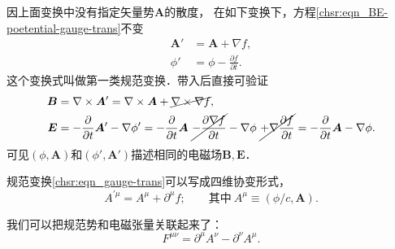 因上面变换中没有指定矢量势$\boldsymbol{A}$的散度，
在如下变换下，方程\eqref{chsr:eqn_BE-poetential-gauge-trans}不变
\begin{subequations}\label{chsr:eqn_gauge-trans}
	\begin{align}
		\boldsymbol{A}' &= \boldsymbol{A} + \nabla f, \label{chsr:eqn_A-gauge-trans} \\
		\phi' &= \phi -\frac{\partial f}{\partial t} . \label{chsr:eqn_phi-gauge-trans}
	\end{align}
\end{subequations}
这个变换式叫做第一类{\heiti 规范变换}．带入后直接可验证
\begin{align*}
	\boldsymbol{B} &= \nabla\times \boldsymbol{A}' = \nabla\times \boldsymbol{A} + \cancel{\nabla \times\nabla f} , \\
	\boldsymbol{E} &= -\frac{\partial}{\partial t} \boldsymbol{A}'  - \nabla \phi' =
	-\frac{\partial}{\partial t} \boldsymbol{A}  \
	\cancel{- \frac{\partial \nabla f}{\partial t} }
	- \nabla \phi \
	\cancel{+ \nabla \frac{\partial f}{\partial t}}
	=-\frac{\partial}{\partial t} \boldsymbol{A}  - \nabla \phi .
\end{align*}
可见$(\phi,\boldsymbol{A})$和$(\phi',\boldsymbol{A}')$描述相同的电磁场$\boldsymbol{B},\boldsymbol{E}$．

规范变换\eqref{chsr:eqn_gauge-trans}可以写成四维协变形式，
\begin{equation}\label{chsr:eqn_gauge-trans-covariant}
	A^{\prime\mu} = A^\mu + \partial^\mu f; \qquad
	\text{其中} \  A^\mu \equiv (\phi/c,\boldsymbol{A}).
\end{equation}

我们可以把规范势和电磁张量关联起来了：
\begin{equation}\label{chsr:eqn_Fab}
    F^{\mu\nu} =\partial^\mu A^\nu - \partial^\nu A^\mu .
\end{equation}


